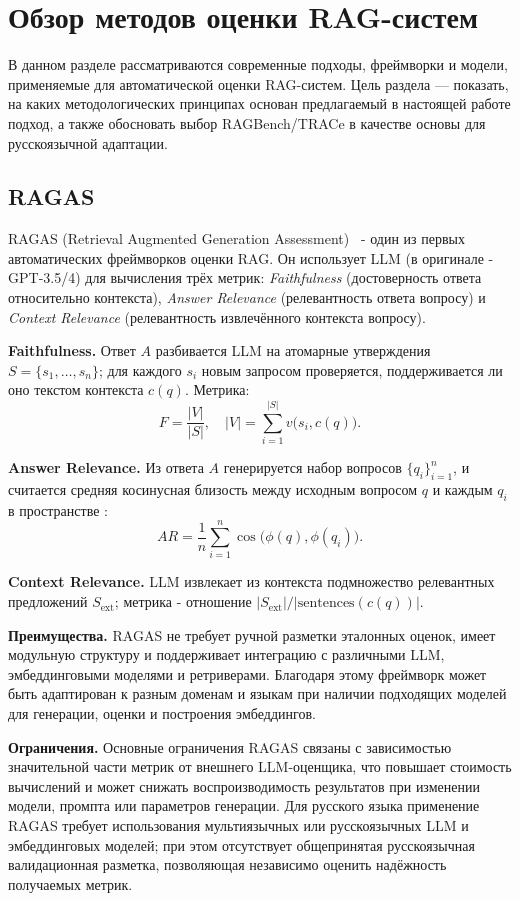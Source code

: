 \section{Обзор методов оценки RAG-систем}
\label{sec:related_work}

В данном разделе рассматриваются современные подходы, фреймворки и
модели, применяемые для автоматической оценки RAG-систем. Цель раздела —
показать, на каких методологических принципах
основан предлагаемый в настоящей работе подход, а также обосновать выбор
RAGBench/TRACe в качестве основы для русскоязычной адаптации.

\subsection{RAGAS}
\label{sec:ragas}

RAGAS (Retrieval Augmented Generation Assessment)~\cite{es2024ragas} - один из
 первых автоматических фреймворков оценки RAG. Он использует LLM (в оригинале - GPT-3.5/4) 
 для вычисления трёх метрик: \emph{Faithfulness} (достоверность ответа относительно контекста),
  \emph{Answer Relevance} (релевантность ответа вопросу) и \emph{Context Relevance} 
  (релевантность извлечённого контекста вопросу).

\textbf{Faithfulness.} Ответ $A$ разбивается LLM на атомарные утверждения
 $S = \{s_1, \dots, s_n\}$; для каждого $s_i$ новым запросом проверяется, поддерживается
  ли оно текстом контекста $c(q)$. Метрика:
\[
F = \frac{|V|}{|S|},\quad |V| = \sum_{i=1}^{|S|} v\bigl(s_i, c(q)\bigr).
\]

\textbf{Answer Relevance.} Из ответа $A$ генерируется набор 
вопросов $\{q_i\}_{i=1}^n$, и считается средняя косинусная близость между
 исходным вопросом $q$ и каждым $q_i$ в пространстве :
\[
AR = \frac{1}{n}\sum_{i=1}^{n}\cos\bigl(\phi(q), \phi(q_i)\bigr).
\]

\textbf{Context Relevance.} LLM извлекает из контекста подмножество 
релевантных предложений $S_\text{ext}$; метрика - отношение $|S_\text{ext}| / |\text{sentences}(c(q))|$.

\noindent\textbf{Преимущества.} RAGAS не требует ручной разметки эталонных 
оценок, имеет модульную структуру и поддерживает интеграцию с различными 
LLM, эмбеддинговыми моделями и ретриверами. Благодаря этому фреймворк может 
быть адаптирован к разным доменам и языкам при наличии подходящих моделей 
для генерации, оценки и построения эмбеддингов.

\noindent\textbf{Ограничения.} Основные ограничения RAGAS связаны с зависимостью 
значительной части метрик от внешнего LLM-оценщика, что повышает стоимость 
вычислений и может снижать воспроизводимость результатов при изменении модели, 
промпта или параметров генерации. Для русского языка применение RAGAS требует 
использования мультиязычных или русскоязычных LLM и эмбеддинговых моделей; 
при этом отсутствует общепринятая русскоязычная валидационная разметка, 
позволяющая независимо оценить надёжность получаемых метрик.

